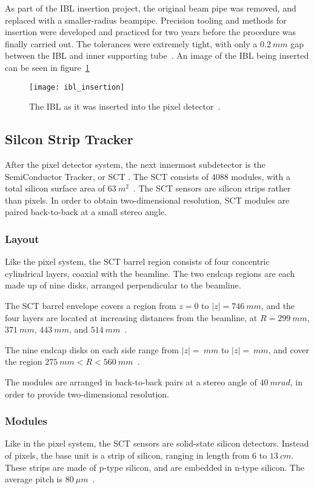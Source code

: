 As part of the IBL insertion project, the original beam pipe was removed, and replaced with a smaller-radius beampipe.
Precision tooling and methods for insertion were developed and practiced for two years before the procedure was finally carried out.
The tolerances were extremely tight, with only a $0.2~mm$ gap between the IBL and inner supporting tube~\cite{ibl-website}.
An image of the IBL being inserted can be seen in figure~\ref{fig:ibl_insertion}

\begin{figure}[!ht]\centering
\texttt{[image: ibl\_insertion]}
\caption{The IBL as it was inserted into the pixel detector~\cite{ibl-website}.}
\label{fig:ibl_insertion}
\end{figure}

\subsection{Silcon Strip Tracker}\label{subsec:sct}

After the pixel detector system, the next innermost subdetector is the SemiConductor Tracker, or SCT .
The SCT consists of 4088 modules, with a total silicon surface area of $63~m^2$~\cite{atlas-detector-2008}.
The SCT sensors are silicon strips rather than pixels.
In order to obtain two-dimensional resolution, SCT modules are paired back-to-back at a small stereo angle.

\subsubsection{Layout}
Like the pixel system, the SCT barrel region consists of four concentric cylindrical layers, coaxial with the beamline.
The two endcap regions are each made up of nine disks, arranged perpendicular to the beamline.

The SCT barrel envelope covers a region from $z = 0$ to $|z|  = 746~mm$,
and the four layers are located at increasing distances from the beamline,
at $R = 299~mm$, $371~mm$, $443~mm$, and $514~mm$~\cite{sct-barrel-2006}.

The nine endcap disks on each side range from $|z| = ~mm$ to $|z| = ~mm$,
and cover the region $275~mm < R < 560~mm$~\cite{atlas-detector-2008}.

The modules are arranged in back-to-back pairs at a stereo angle of $40~mrad$, in order to provide two-dimensional resolution.

\subsubsection{Modules}
Like in the pixel system, the SCT sensors are solid-state silicon detectors.
Instead of pixels, the base unit is a strip of silicon, ranging in length from $6$ to $13~cm$.
These strips are made of p-type silicon, and are embedded in n-type silicon. The average pitch is $80~\mu m$~\cite{sct-2010}.

